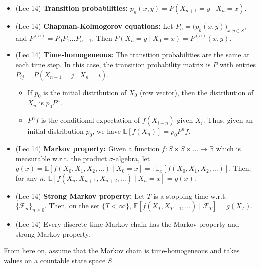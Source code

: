 \documentclass[twoside]{article}
\newcommand\bbE{\mathbb{E}}
\newcommand\bbR{\mathbb{R}}
\newcommand\calF{\mathcal{F}}
\newcommand\sg{\sigma}
\begin{document}
\begin{itemize}
\item (Lec 14) \textbf{Transition probabilities:} $p_n(x, y) = P(X_{n+1} = y \mid X_n = x)$.

\item (Lec 14) \textbf{Chapman-Kolmogorov equations:} Let $P_n = \Bigg( p_k(x, y)\Bigg)_{x, y \in S}$, and $P^{(n)} = P_0 P_1 \dots P_{n-1}$. Then $P(X_n = y \mid X_0 = x) = P^{(n)}(x, y)$.

\item (Lec 14) \textbf{Time-homogeneous:} The transition probabilities are the same at each time step. In this case, the transition probability matrix is $P$ with entries $P_{ij} = P(X_{n+1} = j \mid X_n = i)$.
\begin{itemize}
\item If $p_0$ is the initial distribution of $X_0$ (row vector), then the distribution of $X_n$ is $p_0 P^n$.

\item $P^n f$ is the conditional expectation of $f(X_{i+n})$ given $X_i$. Thus, given an initial distribution $p_0$, we have $\bbE [f(X_n)] = p_0 P^n f$.
\end{itemize}

\item (Lec 14) \textbf{Markov property:} Given a function $f: S \times S \times \dots \rightarrow \bbR$ which is measurable w.r.t. the product $\sg$-algebra, let $g(x) = \bbE [f(X_0, X_1, X_2, \dots ) \mid X_0 = x] =: \bbE_x [f(X_0, X_1, X_2, \dots)]$. Then, for any $n$, $\bbE [f(X_n, X_{n+1}, X_{n+2}, \dots) \mid X_n = x] = g(x)$.

\item (Lec 14) \textbf{Strong Markov property:} Let $T$ is a stopping time w.r.t. $\{ \calF_n \}_{n \geq 0}$. Then, on the set $\{ T < \infty \}$, $\bbE [f(X_T, X_{T+1}, \dots) \mid \calF_T] = g(X_T)$.

\item (Lec 14) Every discrete-time Markov chain has the Markov property and strong Markov property.
\end{itemize}

From here on, assume that the Markov chain is time-homogeneous and takes values on a countable state space $S$.
\end{document}
